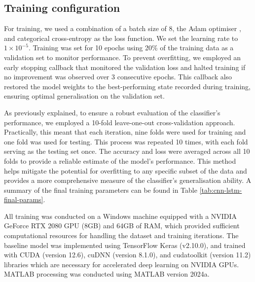 \subsection{Training configuration}

For training, we used a combination of a batch size of 8, the Adam optimiser \cite{kingma_adam_2014}, and categorical cross-entropy as the loss function. We set the learning rate to $1 \times 10^{-5}$. %
Training was set for 10 epochs using 20\% of the training data as a validation set to monitor performance. To prevent overfitting, we employed an early stopping callback that monitored the validation loss and halted training if no improvement was observed over 3 consecutive epochs. This callback also restored the model weights to the best-performing state recorded during training, ensuring optimal generalisation on the validation set.

As previously explained, to ensure a robust evaluation of the classifier's performance, we employed a 10-fold leave-one-out cross-validation approach. Practically, this meant that each iteration, nine folds were used for training and one fold was used for testing. This process was repeated 10 times, with each fold serving as the testing set once. The accuracy and loss were averaged across all 10 folds to provide a reliable estimate of the model's performance. This method helps mitigate the potential for overfitting to any specific subset of the data and provides a more comprehensive measure of the classifier's generalisation ability. A summary of the final training parameters can be found in Table \ref{tab:cnn-lstm-final-params}. 

All training was conducted on a Windows machine equipped with a NVIDIA GeForce RTX 2080 GPU (8GB) and 64GB of RAM, which provided sufficient computational resources for handling the dataset and training iterations. The baseline model was implemented using TensorFlow Keras (v2.10.0), and trained with CUDA (version 12.6), cuDNN (version 8.1.0), and cudatoolkit (version 11.2) libraries which are necessary for accelerated deep learning on NVIDIA GPUs. MATLAB processing was conducted using MATLAB version 2024a.

